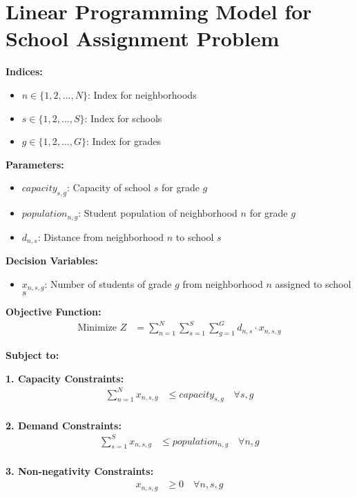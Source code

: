 \documentclass{article}
\begin{document}
\section*{Linear Programming Model for School Assignment Problem}

\textbf{Indices:}
\begin{itemize}
    \item $n \in \{1, 2, \ldots, N\}$: Index for neighborhoods
    \item $s \in \{1, 2, \ldots, S\}$: Index for schools
    \item $g \in \{1, 2, \ldots, G\}$: Index for grades
\end{itemize}

\textbf{Parameters:}
\begin{itemize}
    \item $capacity_{s,g}$: Capacity of school $s$ for grade $g$
    \item $population_{n,g}$: Student population of neighborhood $n$ for grade $g$
    \item $d_{n,s}$: Distance from neighborhood $n$ to school $s$
\end{itemize}

\textbf{Decision Variables:}
\begin{itemize}
    \item $x_{n,s,g}$: Number of students of grade $g$ from neighborhood $n$ assigned to school $s$
\end{itemize}

\textbf{Objective Function:}
\begin{align*}
\text{Minimize } Z &= \sum_{n=1}^{N} \sum_{s=1}^{S} \sum_{g=1}^{G} d_{n,s} \cdot x_{n,s,g}
\end{align*}

\textbf{Subject to:}

\textbf{1. Capacity Constraints:}
\begin{align*}
\sum_{n=1}^{N} x_{n,s,g} &\leq capacity_{s,g} \quad \forall s, g \\
\end{align*}

\textbf{2. Demand Constraints:}
\begin{align*}
\sum_{s=1}^{S} x_{n,s,g} &\leq population_{n,g} \quad \forall n, g \\
\end{align*}

\textbf{3. Non-negativity Constraints:}
\begin{align*}
x_{n,s,g} &\geq 0 \quad \forall n, s, g
\end{align*}
\end{document}

